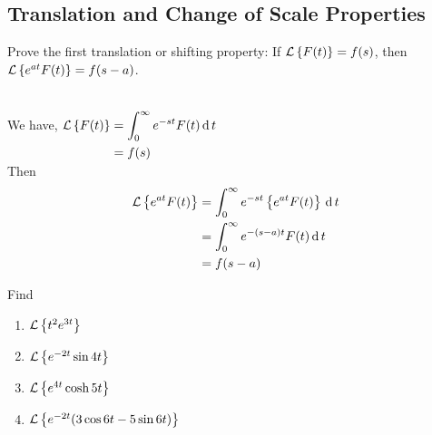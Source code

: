\documentclass[../main-sheet.tex]{subfiles}
\begin{document}
\subsection{Translation and Change of Scale Properties}
\begin{prob}
    Prove the first translation or shifting property: If $ \mathcal{L}\left\{ F(t)\right\}=f(s) $, then $ \mathcal{L}\left\{ e^{at}F(t)\right\}=f(s-a) $.
\end{prob}
\begin{soln}
    We have, $ \begin{aligned}
        & \\
        \mathcal{L}\left\{ F(t)\right\}&= \int_0^\infty e^{-st}F(t)\,\mathrm{d}\, t\\
        &=f(s)
    \end{aligned} $\\
    Then 
    \begin{align*}
        \mathcal{L}\left\{ e^{at}F(t)\right\}&=\int_0^\infty e^{-st}\left\{ e^{at}F(t)\right\}\,\mathrm{d}\, t\\
        &=\int_0^\infty e^{-(s-a)t}F(t)\,\mathrm{d}\, t\\
        &=f(s-a)
    \end{align*}
\end{soln}
\begin{prob}
    Find
    \begin{enumerate}[label={(\alph*)}]
        \item $ \mathcal{L}\left\{ t^2 e^{3t}\right\}$
        \item $ \mathcal{L}\left\{ e^{-2t} \sin 4t\right\}$
        \item $ \mathcal{L}\left\{ e^{4t} \cosh 5t\right\}$
        \item $ \mathcal{L}\left\{ e^{-2t} (3\cos 6t - 5\sin 6t)\right\}$
    \end{enumerate}
\end{prob}
\newpage
\end{document}
